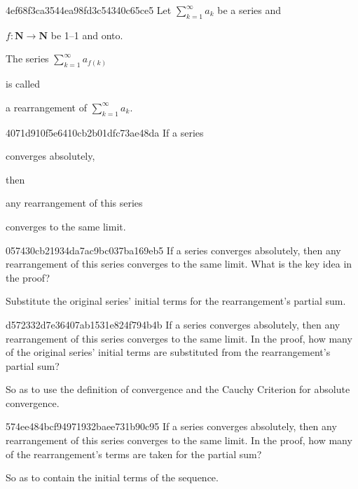 \begin{note}{4ef68f3ca3544ea98fd3c54340c65ce5}
    Let \({ \sum_{k=1}^{\infty} a_k }\) be a series and \begin{icloze}{3}\({ f : \mathbf{N} \to \mathbf{N} }\) be 1--1 and onto.\end{icloze}
    \begin{icloze}{2}The series \({ \sum_{k=1}^{\infty} a_{f(k)} }\)\end{icloze} is called \begin{icloze}{1}a rearrangement of \({ \sum_{k=1}^{\infty} a_k }\).\end{icloze}
\end{note}

\begin{note}{4071d910f5e6410cb2b01dfc73ae48da}
    If a series \begin{icloze}{2}converges absolutely,\end{icloze} then \begin{icloze}{3}any rearrangement of this series\end{icloze} \begin{icloze}{1}converges to the same limit.\end{icloze}
\end{note}

\begin{note}{057430cb21934da7ac9bc037ba169eb5}
    If a series converges absolutely, then any rearrangement of this series converges to the same limit.
    What is the key idea in the proof?

    \begin{cloze}{1}
        Substitute the original series' initial terms for the rearrangement's partial sum.
    \end{cloze}
\end{note}

\begin{note}{d572332d7e36407ab1531e824f794b4b}
    If a series converges absolutely, then any rearrangement of this series converges to the same limit.
    In the proof, how many of the original series' initial terms are substituted from the rearrangement's partial sum?

    \begin{cloze}{1}
        So as to use the definition of convergence and the Cauchy Criterion for absolute convergence.
    \end{cloze}
\end{note}

\begin{note}{574ee484bcf94971932baee731b90c95}
    If a series converges absolutely, then any rearrangement of this series converges to the same limit.
    In the proof, how many of the rearrangement's terms are taken for the partial sum?

    \begin{cloze}{1}
        So as to contain the initial terms of the sequence.
    \end{cloze}
\end{note}

